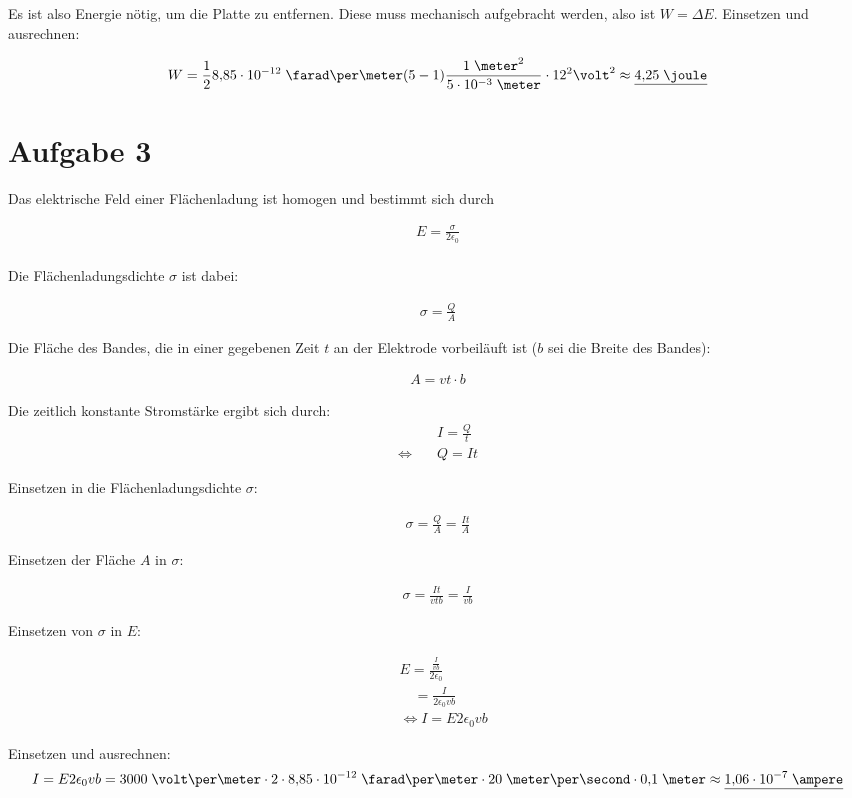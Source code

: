\documentclass[a4paper,german,12pt,smallheadings]{scrartcl}
\begin{document}
Es ist also Energie nötig, um die Platte zu entfernen. Diese muss mechanisch
aufgebracht werden, also ist $W = \Delta E$. Einsetzen und ausrechnen:

\begin{align*}
  W = \frac{1}{2} 8{,}85 \cdot 10^{-12} \;\farad\per\meter (5-1) \frac{1\;\meter^2}{5\cdot 10^{-3}\;\meter} \cdot 12^2 \volt^2 \approx \underline{4{,}25\;\joule}
\end{align*}

\section*{Aufgabe 3}

Das elektrische Feld einer Flächenladung ist homogen und bestimmt sich durch

\begin{align*}
  E = \frac{\sigma}{2 \epsilon_0} \\
\end{align*}

Die Flächenladungsdichte $\sigma$ ist dabei:

\begin{align*}
  \sigma = \frac{Q}{A}
\end{align*}

Die Fläche des Bandes, die in einer gegebenen Zeit $t$ an der Elektrode
vorbeiläuft ist ($b$ sei die Breite des Bandes):

\begin{align*}
  A = vt \cdot b
\end{align*}

Die zeitlich konstante Stromstärke ergibt sich durch:
\begin{align*}
  &I = \frac{Q}{t} \\
  \Leftrightarrow \quad &Q = It
\end{align*}

Einsetzen in die Flächenladungsdichte $\sigma$:

\begin{align*}
  \sigma = \frac{Q}{A} = \frac{It}{A}
\end{align*}

Einsetzen der Fläche $A$ in $\sigma$:

\begin{align*}
  \sigma = \frac{It}{vtb} = \frac{I}{vb} 
\end{align*}

Einsetzen von $\sigma$ in $E$:

\begin{align*}
  &E = \frac{\frac{I}{vb}}{2 \epsilon_0} \\
  &\quad = \frac{I}{2 \epsilon_0 vb} \\
  &\Leftrightarrow I = E 2\epsilon_0 vb
\end{align*}

Einsetzen und ausrechnen:
\begin{align*}
  I = E 2 \epsilon_0 v b = 3000\;\volt\per\meter \cdot 2 \cdot 8{,}85\cdot10^{-12}\;\farad\per\meter \cdot 20\;\meter\per\second \cdot 0{,}1\;\meter \approx \underline{1{,}06 \cdot 10^{-7}\;\ampere}
\end{align*}
\end{document}
